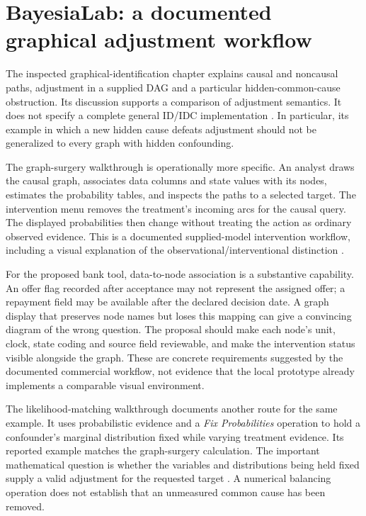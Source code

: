 \section{BayesiaLab: a documented graphical adjustment workflow}

The inspected graphical-identification chapter explains causal and noncausal
paths, adjustment in a supplied DAG and a particular hidden-common-cause
obstruction. Its discussion supports a comparison of adjustment semantics.
It does not specify a complete general ID/IDC implementation
\citep{exec13_ci_bayesia_criteria}. In particular, its example in which a new
hidden cause defeats adjustment should not be generalized to every graph with
hidden confounding.

The graph-surgery walkthrough is operationally more specific. An analyst draws
the causal graph, associates data columns and state values with its nodes,
estimates the probability tables, and inspects the paths to a selected target.
The intervention menu removes the treatment's incoming arcs for the causal
query. The displayed probabilities then change without treating the action as
ordinary observed evidence. This is a documented supplied-model intervention
workflow, including a visual explanation of the observational/interventional
distinction \citep{exec13_ci_bayesia_surgery}.

For the proposed bank tool, data-to-node association is a substantive capability.
An offer flag recorded after acceptance may not represent the assigned offer;
a repayment field may be available after the declared decision date. A graph
display that preserves node names but loses this mapping can give a convincing
diagram of the wrong question. The proposal should make each node's unit,
clock, state coding and source field reviewable, and make the intervention
status visible alongside the graph. These are concrete requirements suggested
by the documented commercial workflow, not evidence that the local prototype
already implements a comparable visual environment.

The likelihood-matching walkthrough documents another route for the same
example. It uses probabilistic evidence and a \emph{Fix Probabilities} operation
to hold a confounder's marginal distribution fixed while varying treatment
evidence. Its reported example matches the graph-surgery calculation. The
important mathematical question is whether the variables and distributions
being held fixed supply a valid adjustment for the requested target
\citep{exec13_ci_bayesia_matching}. A numerical balancing operation does not
establish that an unmeasured common cause has been removed.


